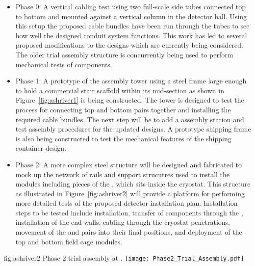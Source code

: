\begin{itemize}
  \item {Phase 0:} A vertical cabling test using two full-scale 
          side tubes connected top to bottom and mounted 
         against a vertical column in the detector hall.  Using this 
         setup the proposed cable bundles have been run through the 
         tubes to see how well the designed conduit system functions.
         This work has led to several proposed modifications to the 
         designs which are currently being considered.  The older 
          trial assembly structure is concurrently 
         being used to perform mechanical tests of  
         components. 
  \item {Phase 1:} A prototype of the   
         assembly tower using a steel frame large enough to hold a 
         commercial stair scaffold within its mid-section as shown 
         in Figure~\ref{fig:ashriver1} is being constructed.  The 
         tower is designed to test the process for connecting top 
         and bottom  pairs together and installing the 
         required cable bundles.  The next step will be to add a
          assembly station and test assembly procedures 
         for the updated  designs.  A prototype 
          shipping frame is also being constructed to 
         test the mechanical features of the shipping container 
         design.  
  \item {Phase 2:} A more complex steel structure will be 
         designed and fabricated to mock up the network of rails 
         and support strucutres used to install the 
          modules including pieces of the , 
         which sits inside the cryostat.  This structure as 
         illustrated in Figure~\ref{fig:ashriver2} will provide 
         a platform for performing more detailed tests of the 
         proposed detector installation plan.  Installation steps 
         to be tested include  installation, transfer 
         of  components through the , 
         installation of the  end walls, cabling 
         through the cryostat penetrations, movement of the 
          and   pairs into their final 
         positions, and deployment of the top and bottom field 
         cage modules.
\end{itemize}
\begin{dunefigure}{fig:ashriver2}
  {Phase 2 trial assembly at .}
  \texttt{[image: Phase2\_Trial\_Assembly.pdf]}
\end{dunefigure}

